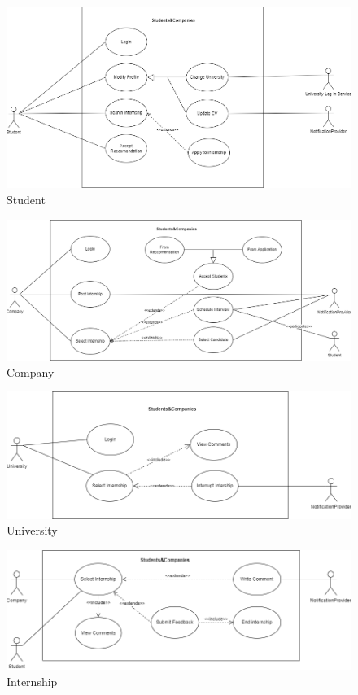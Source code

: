 \documentclass{article}
\begin{document}
\begin{figure}[H]
    \centering
    \includegraphics[scale = 0.45]{figures/Student.drawio.png}
    \caption{Student}
    \centering
\end{figure}
\begin{figure}[H]
    \centering
    \includegraphics[scale = 0.4]{figures/Company.drawio.png}
    \caption{Company}
    \centering
\end{figure}
\begin{figure}[H]
    \centering
    \includegraphics[scale = 0.45]{figures/use_case_1-University.drawio.png}
    \caption{University}
    \centering
\end{figure}
\begin{figure}[H]
    \centering
    \includegraphics[scale = 0.45]{figures/use_case_1-Student - Company.drawio.png}
    \caption{Internship}
    \centering
\end{figure}
\newpage
\end{document}
